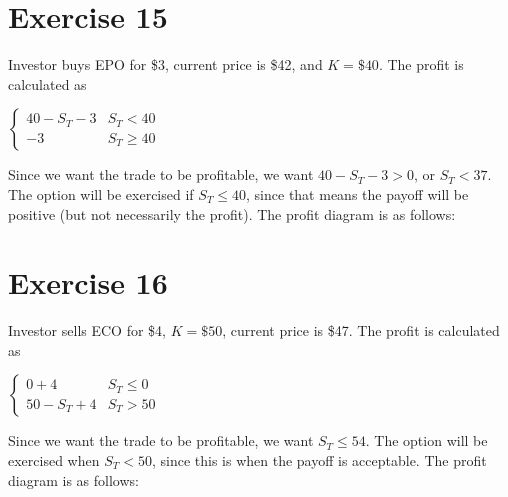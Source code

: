 \documentclass{article}
\begin{document}
\section*{Exercise 15}
Investor buys EPO for \$3, current price is \$42, and $K=\$40$. The profit is calculated as \\
    \begin{center}
        $\begin{cases}
            40 - S_T - 3 & S_T < 40 \\
            -3 & S_T \geq 40
        \end{cases}$
    \end{center}
Since we want the trade to be profitable, we want $40 - S_T - 3 > 0$, or $S_T < 37$. The option will be exercised if $S_T \leq 40$, since that means the payoff will be positive (but not necessarily the profit).
The profit diagram is as follows:
\begin{center}
\end{center}

\break

\section*{Exercise 16}
Investor sells ECO for \$4, $K = \$50$, current price is \$47. The profit is calculated as \\
\begin{center}
    $\begin{cases}
        0 + 4 & S_T \leq 0 \\
        50 - S_T + 4 & S_T > 50
    \end{cases}$
\end{center}
Since we want the trade to be profitable, we want $S_T \leq 54$. The option will be exercised when $S_T < 50$, since this is when the payoff is acceptable.
The profit diagram is as follows:
\begin{center}
\end{center}
\end{document}
